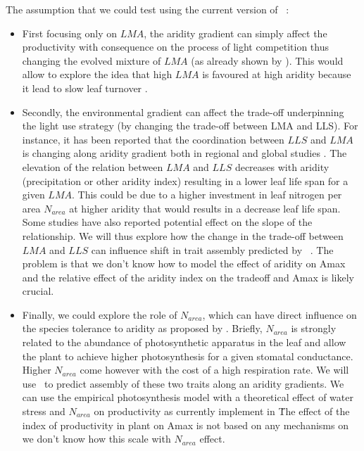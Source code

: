 \documentclass[a4paper,11pt]{article}
\begin{document}
The assumption that we could test using the current version of \plant\ :

\begin{itemize}

\item First focusing only on $LMA$, the aridity gradient can simply affect
the productivity with consequence on the process of light competition thus changing the evolved mixture of $LMA$ (as already shown by \citep{Falster-2017}). This would allow to explore the idea that high $LMA$ is favoured at high aridity because it lead to slow leaf turnover \citep{Wright-2002b}.

\item Secondly, the environmental gradient can affect the
trade-off underpinning the light use strategy (by changing the
trade-off between LMA and LLS). For instance, it has been reported
that the coordination between $LLS$ and $LMA$ is changing along
aridity gradient both in regional \citep{Wright-2002b} and global
studies \citep{Wright-2004}. The elevation of the relation between
$LMA$ and $LLS$ decreases with aridity (precipitation or other aridity index) resulting in a lower leaf life
span for a given $LMA$. This could be due to a higher
investment in leaf nitrogen per area $N_{area}$ at higher aridity
\citep{Wright-2002b} that would results in a decrease leaf life span. Some studies have also reported potential
effect on the slope of the relationship. We will thus explore how the
change in the trade-off between $LMA$ and $LLS$ can influence shift in
trait assembly predicted by \plant\ . The problem is that we don't know how to model the effect of aridity on Amax and the relative effect of the aridity index on the tradeoff and Amax is likely crucial.

\item Finally, we could explore the role of $N_{area}$, which can have direct influence on the species tolerance to aridity as proposed by \citet{Wright-2003}. Briefly, $N_{area}$ is strongly related to the
  abundance of photosynthetic apparatus in the leaf and allow the
  plant to achieve higher photosynthesis for a given stomatal
  conductance. Higher $N_{area}$ come however with the cost of a high
  respiration rate. We will use \plant\ to predict assembly of these
  two traits along an aridity gradients. We can use the empirical photosynthesis model with a theoretical effect of
  water stress and $N_{area}$ on productivity as currently implement in \plant\. The effect of the index of productivity in plant on Amax is not based on any mechanisms on we don't know how this scale with $N_{area}$ effect. 
\end{itemize}
\end{document}
